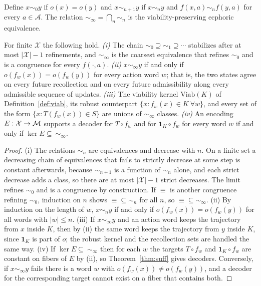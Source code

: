 \begin{definition}\label{def:viabequiv}
Define $x\sim_0y$ if $o(x)=o(y)$ and $x\sim_{n+1}y$ if $x\sim_ny$ and $f(x,a)\sim_nf(y,a)$ for every $a\in\mathcal A$. The relation $\sim_\infty=\bigcap_n\sim_n$ is the viability-preserving ecphoric equivalence.
\end{definition}

\begin{extension}\label{ext:viabequiv}
For finite $\mathcal X$ the following hold. \emph{(i)} The chain $\sim_0\supseteq\sim_1\supseteq\cdots$ stabilizes after at most $|\mathcal X|-1$ refinements, and $\sim_\infty$ is the coarsest equivalence that refines $\sim_0$ and is a congruence for every $f(\cdot,a)$. \emph{(ii)} $x\sim_\infty y$ if and only if $o(f_w(x))=o(f_w(y))$ for every action word $w$; that is, the two states agree on every future recollection and on every future admissibility along every admissible sequence of updates. \emph{(iii)} The viability kernel $\mathrm{Viab}(K)$ of Definition~\ref{def:viab}, its robust counterpart $\{x:f_w(x)\in K\ \forall w\}$, and every set of the form $\{x: T(f_w(x))\in S\}$ are unions of $\sim_\infty$ classes. \emph{(iv)} An encoding $E:\mathcal X\to\mathcal{M}$ supports a decoder for $T\circ f_w$ and for $\mathbf 1_K\circ f_w$ for every word $w$ if and only if $\ker E\subseteq\ \sim_\infty$.
\end{extension}

\begin{proof}
(i) The relations $\sim_n$ are equivalences and decrease with $n$. On a finite set a decreasing chain of equivalences that fails to strictly decrease at some step is constant afterwards, because $\sim_{n+1}$ is a function of $\sim_n$ alone, and each strict decrease adds a class, so there are at most $|\mathcal X|-1$ strict decreases. The limit refines $\sim_0$ and is a congruence by construction. If $\equiv$ is another congruence refining $\sim_0$, induction on $n$ shows $\equiv\subseteq\sim_n$ for all $n$, so $\equiv\subseteq\sim_\infty$. (ii) By induction on the length of $w$, $x\sim_ny$ if and only if $o(f_w(x))=o(f_w(y))$ for all words with $|w|\le n$. (iii) If $x\sim_\infty y$ and an action word keeps the trajectory from $x$ inside $K$, then by (ii) the same word keeps the trajectory from $y$ inside $K$, since $\mathbf 1_K$ is part of $o$; the robust kernel and the recollection sets are handled the same way. (iv) If $\ker E\subseteq\ \sim_\infty$ then for each $w$ the targets $T\circ f_w$ and $\mathbf 1_K\circ f_w$ are constant on fibers of $E$ by (ii), so Theorem~\ref{thm:suff} gives decoders. Conversely, if $x\sim_\infty y$ fails there is a word $w$ with $o(f_w(x))\ne o(f_w(y))$, and a decoder for the corresponding target cannot exist on a fiber that contains both.
\end{proof}

